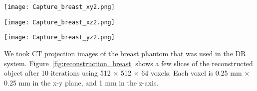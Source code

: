 \begin{figure*}
	\begin{minipage}{0.3\linewidth}
		\texttt{[image: Capture\_breast\_xy2.png]}
		\subcaption{}
	\end{minipage}
	\vspace{0.3cm}
	\begin{minipage}{0.3\linewidth}
		\texttt{[image: Capture\_breast\_xz2.png]}
		\subcaption{}
	\end{minipage}
	\vspace{0.3cm}
	\begin{minipage}{0.3\linewidth}
		\texttt{[image: Capture\_breast\_yz2.png]}
		\subcaption{}
	\end{minipage}
\caption[A slice of the reconstructed phantom in the (a) x-y plane (b) x-z plane, and (c) y-z plane, calculated using 512 $\times$ 512 $\times$ 128 voxels after 10 iterations, where each voxel size is 0.25 mm $\times$ 0.25 mm $\times$ 0.5 mm in the x, y, and z direction.]{A slice of the reconstructed phantom in the (a) x-y plane (b) x-z plane, and (c) y-z plane, calculated using 512 $\times$ 512 $\times$ 128 voxels after 10 iterations, where each voxel size is 0.25 mm $\times$ 0.25 mm $\times$ 0.5 mm in the x, y, and z direction.}
\label{fig:reconstruction_breast}
\end{figure*}

We took CT projection images of the breast phantom that was used in the DR system.  Figure~\ref{fig:reconstruction_breast} shows a few slices of the reconstructed object after 10 iterations using 512 $\times$ 512 $\times$ 64 voxels.  Each voxel is 0.25 mm $\times$ 0.25 mm in the x-y plane, and 1 mm in the z-axis.

